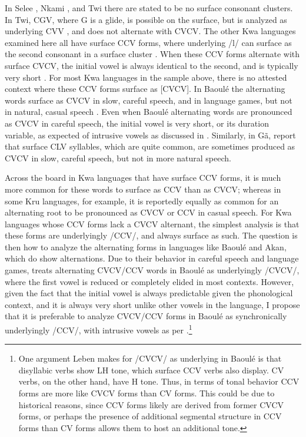 \documentclass[output=paper,colorlinks,citecolor=brown]{langscibook}
\begin{document}
\largerpage[-1]
In Selee \citep{Agbetsoamedo:2014}, Nkami \citep{Asante:2017}, and Twi \citep{Paster:2010} there are stated to be no surface consonant clusters. In Twi, CGV, where G is a glide, is possible on the surface, but is analyzed as underlying CVV \citep{Paster:2010}, and does not alternate with CVCV. The other Kwa languages examined here all have surface CCV forms, where underlying /l/ can surface as the second consonant in a surface cluster \citep{LeSaout:1974}. When these CCV forms alternate with surface CVCV, the initial vowel is always identical to the second, and is typically very short \citep{Dolphyne:1988, Ahua:2004, Leben:2002}. For most Kwa languages in the sample above, there is no attested context where these CCV forms surface as [CVCV]. In Baoulé the alternating words surface as CVCV in slow, careful speech, and in language games, but not in natural, casual speech \citep{Leben:2002, Leben:2003}. Even when Baoulé alternating words are pronounced as CVCV in careful speech, the initial vowel is very short, or its duration variable, as expected of intrusive vowels as discussed in . Similarly, in Gã, \citet[41--42]{Berry:1969} report that surface CLV syllables, which are quite common, are sometimes produced as CVCV in slow, careful speech, but not in more natural speech.


\largerpage[-1]
Across the board in Kwa languages that have surface CCV forms, it is much more common for these words to surface as CCV than as CVCV; whereas in some Kru languages, for example, it is reportedly equally as common for an alternating root to be pronounced as CVCV or CCV in casual speech. For Kwa languages whose CCV forms lack a CVCV alternant, the simplest analysis is that these forms are underlyingly /CCV/, and always surface as such. The question is then how to analyze the alternating forms in languages like Baoulé and Akan, which do show alternations. Due to their behavior in careful speech and language games, \citet{Leben:2002, Leben:2003} treats alternating CVCV\slash CCV words in Baoulé as underlyingly /CVCV/, where the first vowel is reduced or completely elided in most contexts. However, given the fact that the initial vowel is always predictable given the phonological context, and it is always very short unlike other vowels in the language, I propose that it is preferable to analyze CVCV\slash CCV forms in Baoulé as synchronically underlyingly /CCV/, with intrusive vowels as per \citet{Hall:2003, Hall2006}.\footnote{One argument Leben makes for /CVCV/ as underlying in Baoulé is that disyllabic verbs show LH tone, which surface CCV verbs also display. CV verbs, on the other hand, have H tone. Thus, in terms of tonal behavior CCV forms are more like CVCV forms than CV forms. This could be due to historical reasons, since CCV forms likely are derived from former CVCV forms, or perhaps the presence of additional segmental structure in CCV forms than CV forms allows them to host an additional tone.}
\end{document}
